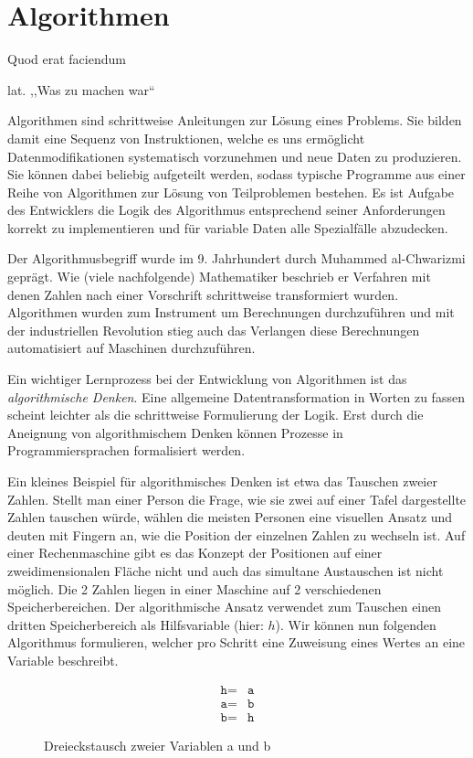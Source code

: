 \chapter{Algorithmen}
\epigraph{Quod erat faciendum}{lat. ,,Was zu machen war``}
%
Algorithmen sind schrittweise Anleitungen zur Lösung eines Problems. Sie bilden damit eine Sequenz von Instruktionen, welche es uns ermöglicht Datenmodifikationen systematisch vorzunehmen und neue Daten zu produzieren. Sie können dabei beliebig aufgeteilt werden, sodass typische Programme aus einer Reihe von Algorithmen zur Lösung von Teilproblemen bestehen. Es ist Aufgabe des Entwicklers die Logik des Algorithmus entsprechend seiner Anforderungen korrekt zu implementieren und für variable Daten alle Spezialfälle abzudecken.

Der Algorithmusbegriff wurde im 9. Jahrhundert durch Muhammed al-Chwarizmi geprägt. Wie (viele nachfolgende) Mathematiker beschrieb er Verfahren mit denen Zahlen nach einer Vorschrift schrittweise transformiert wurden. Algorithmen wurden zum Instrument um Berechnungen durchzuführen und mit der industriellen Revolution stieg auch das Verlangen diese Berechnungen automatisiert auf Maschinen durchzuführen.

Ein wichtiger Lernprozess bei der Entwicklung von Algorithmen ist das \emph{algorithmische Denken}. Eine allgemeine Datentransformation in Worten zu fassen scheint leichter als die schrittweise Formulierung der Logik. Erst durch die Aneignung von algorithmischem Denken können Prozesse in Programmiersprachen formalisiert werden.

Ein kleines Beispiel für algorithmisches Denken ist etwa das Tauschen zweier Zahlen. Stellt man einer Person die Frage, wie sie zwei auf einer Tafel dargestellte Zahlen tauschen würde, wählen die meisten Personen eine visuellen Ansatz und deuten mit Fingern an, wie die Position der einzelnen Zahlen zu wechseln ist. Auf einer Rechenmaschine gibt es das Konzept der Positionen auf einer zweidimensionalen Fläche nicht und auch das simultane Austauschen ist nicht möglich. Die 2 Zahlen liegen in einer Maschine auf 2 verschiedenen Speicherbereichen. Der algorithmische Ansatz verwendet zum Tauschen einen dritten Speicherbereich als Hilfsvariable (hier: $h$). Wir können nun folgenden Algorithmus formulieren, welcher pro Schritt eine Zuweisung eines Wertes an eine Variable beschreibt.
%
\begin{figure}[h]
 \begin{center}
  \begin{align*}
  \texttt{h} \texttt{=} & \texttt{a} \\
  \texttt{a} \texttt{=} & \texttt{b} \\
  \texttt{b} \texttt{=} & \texttt{h}
  \end{align*}
  \caption{Dreieckstausch zweier Variablen a und b}
 \end{center}
\end{figure}

